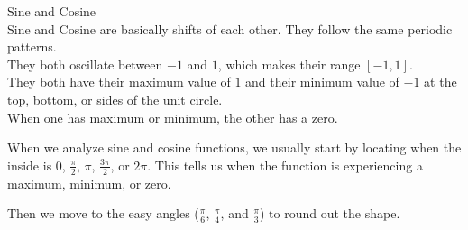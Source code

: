 \documentclass{ximera}
\begin{document}
\begin{example}
\begin{explanation}
\begin{image}
\end{image}







\end{explanation}


\end{example}






\begin{summary} Sine and Cosine \\


Sine and Cosine are basically shifts of each other.  They follow the same periodic patterns. \\

They both oscillate between $-1$ and $1$, which makes their range $[-1,1]$. \\

They both have their maximum value of $1$ and their minimum value of $-1$ at the top, bottom, or sides of the unit circle. \\

When one has maximum or minimum, the other has a zero. \\

\end{summary}


When we analyze sine and cosine functions, we usually start by locating when the inside is $0$, $\frac{\pi}{2}$, $\pi$, $\frac{3\pi}{2}$, or $2\pi$.  This tells us when the function is experiencing a maximum, minimum, or zero.

Then we move to the easy angles ($\frac{\pi}{6}$, $\frac{\pi}{4}$, and $\frac{\pi}{3}$) to round out the shape. \\
\end{document}
